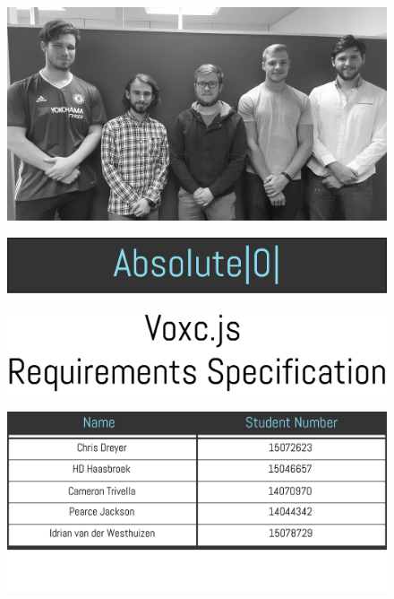 \documentclass[english]{article}
\begin{document}
	
	
	\begin{figure}[H]
		\includegraphics[width=\linewidth]{teamphoto.jpg}
	\end{figure}

	\begin{figure}[H]
		\includegraphics[width=\linewidth]{teamtitle.jpg}
	\end{figure}

	\begin{figure}[H]
		\includegraphics[width=\linewidth]{documenttitle.jpg}
	\end{figure}

	\begin{figure}[H]
		\includegraphics[width=\linewidth]{teamtable.jpg}
	\end{figure}
	
\end{document}
